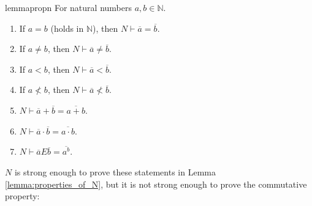 \documentclass[11pt,letterpaper]{book}
\theoremstyle{definition}
\begin{document}
\begin{restatable}{lemma}{propn}
\label{lemma:properties_of_N}
For natural numbers $a, b \in \mathbb{N}$.
\begin{enumerate}
\item{If $a=b$ (holds in $\mathbb{N}$), then $N \vdash \overline{a} = 
\overline{b}$.}
\item{If $a \neq b $, then $N \vdash \overline{a} \neq \overline{b}$.}
\item{If $a < b$, then $N \vdash \overline{a} < \overline{b}$.}
\item{If $a \not < b$, then $N \vdash \overline{a} \not < \overline{b} $.}
\item{$N \vdash \overline{a} + \overline{b } = \overline{a+b}$.}
\item{$N \vdash \overline{a} \cdot \overline{b} = \overline{a \cdot b}$.}
\item{$N \vdash \overline{a} E \overline{b} = \overline{a^b} $.}
\end{enumerate}
\end{restatable}

$N$ is strong enough to prove these statements in Lemma \ref{lemma:properties_of_N}, but it is not strong enough to prove the commutative property:
\end{document}
